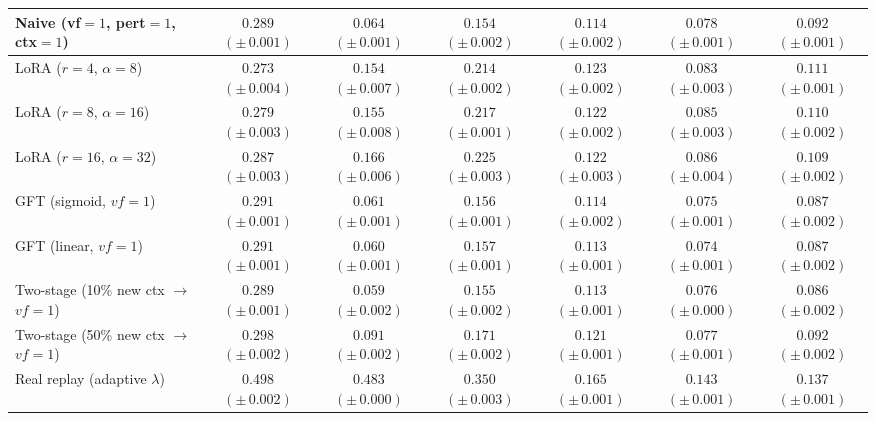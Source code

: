 \begin{table}[t]
{\begin{tabular}{@{}lcccccc@{}}
Naive (vf${=}1$, pert${=}1$, ctx${=}1$) & $0.289$ {\scriptsize $(\pm\,0.001)$} & $0.064$ {\scriptsize $(\pm\,0.001)$} & $0.154$ {\scriptsize $(\pm\,0.002)$} & $0.114$ {\scriptsize $(\pm\,0.002)$} & $0.078$ {\scriptsize $(\pm\,0.001)$} & $0.092$ {\scriptsize $(\pm\,0.001)$} \\
\midrule
LoRA ($r{=}4$, $\alpha{=}8$) & $0.273$ {\scriptsize $(\pm\,0.004)$} & $0.154$ {\scriptsize $(\pm\,0.007)$} & $0.214$ {\scriptsize $(\pm\,0.002)$} & $0.123$ {\scriptsize $(\pm\,0.002)$} & $0.083$ {\scriptsize $(\pm\,0.003)$} & $0.111$ {\scriptsize $(\pm\,0.001)$} \\
LoRA ($r{=}8$, $\alpha{=}16$) & $0.279$ {\scriptsize $(\pm\,0.003)$} & $0.155$ {\scriptsize $(\pm\,0.008)$} & $0.217$ {\scriptsize $(\pm\,0.001)$} & $0.122$ {\scriptsize $(\pm\,0.002)$} & $0.085$ {\scriptsize $(\pm\,0.003)$} & $0.110$ {\scriptsize $(\pm\,0.002)$} \\
LoRA ($r{=}16$, $\alpha{=}32$) & $0.287$ {\scriptsize $(\pm\,0.003)$} & $0.166$ {\scriptsize $(\pm\,0.006)$} & $0.225$ {\scriptsize $(\pm\,0.003)$} & $0.122$ {\scriptsize $(\pm\,0.003)$} & $0.086$ {\scriptsize $(\pm\,0.004)$} & $0.109$ {\scriptsize $(\pm\,0.002)$} \\
GFT (sigmoid, $vf{=}1$) & $0.291$ {\scriptsize $(\pm\,0.001)$} & $0.061$ {\scriptsize $(\pm\,0.001)$} & $0.156$ {\scriptsize $(\pm\,0.001)$} & $0.114$ {\scriptsize $(\pm\,0.002)$} & $0.075$ {\scriptsize $(\pm\,0.001)$} & $0.087$ {\scriptsize $(\pm\,0.002)$} \\
GFT (linear, $vf{=}1$) & $0.291$ {\scriptsize $(\pm\,0.001)$} & $0.060$ {\scriptsize $(\pm\,0.001)$} & $0.157$ {\scriptsize $(\pm\,0.001)$} & $0.113$ {\scriptsize $(\pm\,0.001)$} & $0.074$ {\scriptsize $(\pm\,0.001)$} & $0.087$ {\scriptsize $(\pm\,0.002)$} \\
Two-stage (10\% new ctx $\to$ $vf{=}1$) & $0.289$ {\scriptsize $(\pm\,0.001)$} & $0.059$ {\scriptsize $(\pm\,0.002)$} & $0.155$ {\scriptsize $(\pm\,0.002)$} & $0.113$ {\scriptsize $(\pm\,0.001)$} & $0.076$ {\scriptsize $(\pm\,0.000)$} & $0.086$ {\scriptsize $(\pm\,0.002)$} \\
Two-stage (50\% new ctx $\to$ $vf{=}1$) & $0.298$ {\scriptsize $(\pm\,0.002)$} & $0.091$ {\scriptsize $(\pm\,0.002)$} & $0.171$ {\scriptsize $(\pm\,0.002)$} & $0.121$ {\scriptsize $(\pm\,0.001)$} & $0.077$ {\scriptsize $(\pm\,0.001)$} & $0.092$ {\scriptsize $(\pm\,0.002)$} \\
\midrule
\rowcolor{referencerow} Real replay (adaptive $\lambda$) & $0.498$ {\scriptsize $(\pm\,0.002)$} & $0.483$ {\scriptsize $(\pm\,0.000)$} & $0.350$ {\scriptsize $(\pm\,0.003)$} & $0.165$ {\scriptsize $(\pm\,0.001)$} & $0.143$ {\scriptsize $(\pm\,0.001)$} & $0.137$ {\scriptsize $(\pm\,0.001)$} \\

\end{tabular}}
\end{table}
